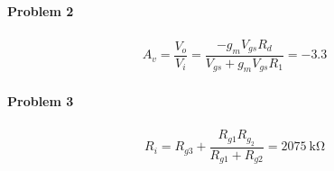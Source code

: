 \documentclass{article}
\begin{document}
\paragraph{Problem 2}

\begin{equation*}
  \begin{aligned}
    A_v = \dfrac{V_o}{V_i} = \dfrac{- g_m V_{gs} R_d}{V_{gs} + g_m V_{gs} R_1} = - 3.3 
  \end{aligned}
\end{equation*}

\paragraph{Problem 3}

\begin{equation*}
  \begin{aligned}
    R_i = R_{g3} + \dfrac{R_{g1} R_{g_2}}{R_{g1} + R_{g2}} =  2075 \  \mathrm{k \Omega}
  \end{aligned}
\end{equation*}
\end{document}
